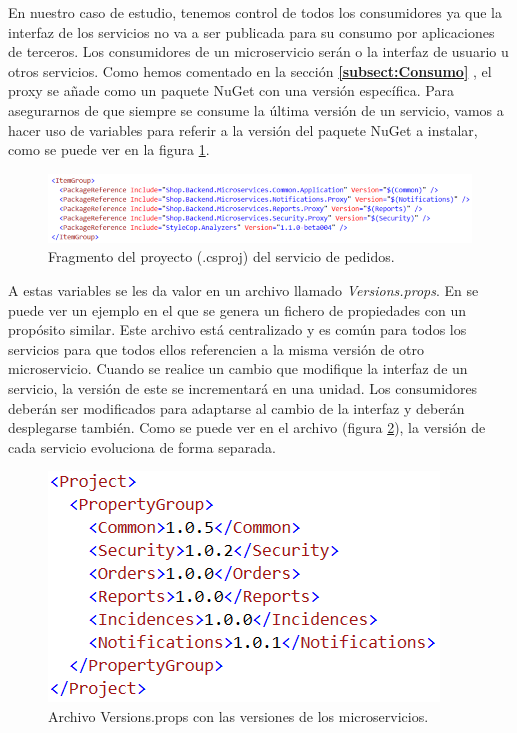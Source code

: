 \documentclass[11pt,spanish,listoffigures]{tfgetsinf}
\begin{document}
En nuestro caso de estudio, tenemos control de todos los consumidores ya que la interfaz de los servicios no va a ser publicada para su consumo por aplicaciones de terceros. Los consumidores de un microservicio serán o la interfaz de usuario u otros servicios. Como hemos comentado en la sección \textbf{\ref{subsect:Consumo} }, el proxy se añade como un paquete NuGet con una versión específica. Para asegurarnos de que siempre se consume la última versión de un servicio, vamos a hacer uso de variables para referir a la versión del paquete NuGet a instalar, como se puede ver en la figura \ref{fig:Csproj}.

\begin{figure}[h]
\centering
\includegraphics[scale=0.9]{OrdersNuGets}
\caption{Fragmento del proyecto (.csproj) del servicio de pedidos.}
\label{fig:Csproj}
\end{figure}

A estas variables se les da valor en un archivo llamado \textit{Versions.props}. En \cite{Levesque2017} se puede ver un ejemplo en el que se genera un fichero de propiedades con un propósito similar. Este archivo está centralizado y es común para todos los servicios para que todos ellos referencien a la misma versión de otro microservicio. Cuando se realice un cambio que modifique la interfaz de un servicio, la versión de este se incrementará en una unidad. Los consumidores deberán ser modificados para adaptarse al cambio de la interfaz y deberán desplegarse también. Como se puede ver en el archivo (figura \ref{fig:Versionsprops}), la versión de cada servicio evoluciona de forma separada.

\begin{figure}[h]
\centering
\includegraphics[scale=0.9]{Versionsprops}
\caption{Archivo Versions.props con las versiones de los microservicios.}
\label{fig:Versionsprops}
\end{figure}
\end{document}

